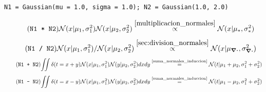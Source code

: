 \documentclass[a4paper,10pt]{book}
\newcommand{\N}{\mathcal{N}}
\theoremstyle{definition}
\newif\ifen
\newif\ifes
\newcommand{\en}[1]{\ifen#1\fi}
\newcommand{\es}[1]{\ifes#1\fi}
\begin{document}
\en{The \texttt{Gaussian} class does most of the computation of the packages. }%
\es{La clase \texttt{Gaussian} realiza la mayor parte del c\'omputo en todos los paquetes. }%
%
\en{It is characterized by the mean (\texttt{mu}) and the standard deviation (\texttt{sigma}). }%
\es{Se representa mediante dos par\'ametros, la media y el desv\'io estandar. }%
\begin{lstlisting}[backgroundcolor=\color{all},label=lst:N1_N2, caption={\en{Initialization of Gaussians distributions}\es{Inicializaci\'on de distirbuciones gaussianas}}, belowskip=-1.0 \baselineskip, aboveskip=-0 \baselineskip]
\end{lstlisting}
\begin{lstlisting}[backgroundcolor=\color{all}, belowskip=0.0 \baselineskip]
N1 = Gaussian(mu = 1.0, sigma = 1.0); N2 = Gaussian(1.0, 2.0)  
\end{lstlisting}
%
\en{The class overwrites the addition (\texttt{+}), subtraction (\texttt{-}), product (\texttt{*}), and division (\texttt{/}) to compute the marginal distributions used in the TrueSkill Through Time model. }%
\es{La clase sobreescribe los operadores suma (\texttt{+}), resta (\texttt{-}), producto (\texttt{*}) y divisi\'on (\texttt{/}) con las principales propiedades requeridas para computar las distribuciones marginales en el modelo TrueSkill Through Time. }%
%
\begin{equation*} \tag{\texttt{N1 * N2}}
 \N(x|\mu_1,\sigma_1^2)\N(x|\mu_2,\sigma_2^2) \overset{\ref{multiplicacion_normales}}{\propto} \N(x|\mu_{*},\sigma_{*}^2)
\end{equation*}
%
\begin{equation*} \tag{\texttt{N1 / N2}}
 \N(x|\mu_1,\sigma_1^2)/\N(x|\mu_2,\sigma_2^2)  \overset{\ref{sec:division_normales}}{\propto} \N(x|\mu_{\div},\sigma_{\div}^2)
\end{equation*} 
%
\vspace{-0.3cm}
%
\begin{equation*} \tag{\texttt{N1 + N2}} \label{eq:suma_normales}
\begin{split}
\iint \delta(t=x + y) \N(x|\mu_1, \sigma_1^2)\N(y|\mu_2, \sigma_2^2) dxdy \overset{\text{\ref{suma_normales_induccion}}}{=} \N(t|\mu_1+\mu_2,\sigma_1^2 + \sigma_2^2)
\end{split}
\end{equation*}
%
\vspace{-0.5cm}
%
\begin{equation*} \tag{\texttt{N1 - N2}} \label{eq:resta_normales}
\begin{split}
\iint \delta(t = x - y) \N(x|\mu_1, \sigma_1^2)\N(y|\mu_2, \sigma_2^2) dxdy \overset{\text{\ref{suma_normales_induccion}}}{=} \N(t|\mu_1 - \mu_2,\sigma_1^2 + \sigma_2^2)
\end{split}
\end{equation*}
%
\en{Although these properties are widely known, we attach their complete demonstrations in the supplemental material. }%
\es{Aunque estas propiedades son ampliamente conocidas, adjuntamos sus demostraciones completas en el material suplementario. }%
\end{document}
